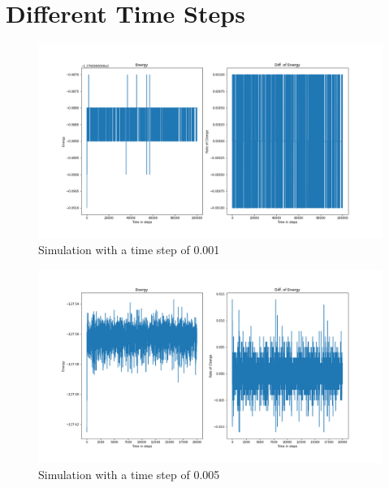 \section{Different Time Steps}
\begin{figure}[!h]
	\begin{center}
		\includegraphics[scale=0.35]{Figure/plot_001.png}
	\end{center}
	\caption[Simulation]{Simulation with a time step of 0.001}
	\label{Plot001}
\end{figure}
\begin{figure}[!h]
	\begin{center}
		\includegraphics[scale= 0.35]{Figure/plot_005.png}
	\end{center}
	\caption[Simulation]{Simulation with a time step of 0.005}
	\label{Plot005}
\end{figure}
